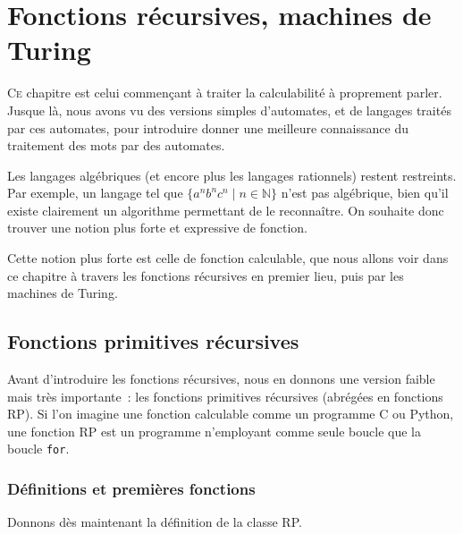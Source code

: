 \chapter{Fonctions récursives, machines de Turing}
\label{chp.recur}

\minitoc

\lettrine{C}{e} chapitre est celui commençant à traiter la calculabilité à
proprement parler. Jusque là, nous avons vu des versions simples d'automates, et
de langages traités par ces automates, pour introduire donner une meilleure
connaissance du traitement des mots par des automates.

Les langages algébriques (et encore plus les langages rationnels) restent
restreints. Par exemple, un langage tel que $\{a^nb^nc^n\mid n \in \mathbb N\}$
n'est pas algébrique, bien qu'il existe clairement un algorithme permettant de
le reconnaître. On souhaite donc trouver une notion plus forte et expressive de
fonction.

Cette notion plus forte est celle de fonction calculable, que nous allons voir
dans ce chapitre à travers les fonctions récursives en premier lieu, puis par
les machines de Turing.

\section{Fonctions primitives récursives}

Avant d'introduire les fonctions récursives, nous en donnons une version faible
mais très importante~: les fonctions primitives récursives (abrégées en
fonctions RP). Si l'on imagine une fonction calculable comme un programme
C ou Python, une fonction RP est un programme n'employant comme seule boucle que
la boucle \texttt{for}.

\subsection{Définitions et premières fonctions}

Donnons dès maintenant la définition de la classe RP.

